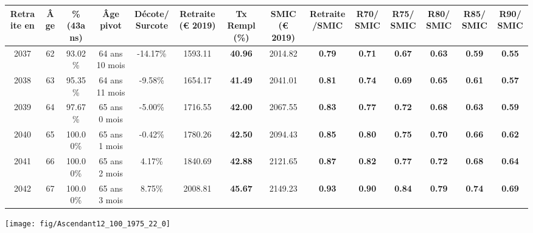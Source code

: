 \begin{adjustbox}{max width=\textwidth} 
\begin{tabular}[htb]{|c|c||c|c|c||c|c||c|c||c|c|c|c|c|} 
\hline 
 Retraite en &  Âge &  \%(43ans) &  Âge pivot &  Décote/Surcote &  Retraite (\euro{} 2019) &  Tx Rempl(\%) &  SMIC (\euro{} 2019) &  Retraite/SMIC &  R70/SMIC &  R75/SMIC &  R80/SMIC &  R85/SMIC &  R90/SMIC \\ 
\hline \hline 
 2037 &  62 &  93.02\% &  64 ans 10 mois &  -14.17\% &  1593.11 &  {\bf 40.96} &  2014.82 &  {\bf {\color{red} 0.79}} &  {\bf {\color{red} 0.71}} &  {\bf {\color{red} 0.67}} &  {\bf {\color{red} 0.63}} &  {\bf {\color{red} 0.59}} &  {\bf {\color{red} 0.55}} \\ 
\hline 
 2038 &  63 &  95.35\% &  64 ans 11 mois &  -9.58\% &  1654.17 &  {\bf 41.49} &  2041.01 &  {\bf {\color{red} 0.81}} &  {\bf {\color{red} 0.74}} &  {\bf {\color{red} 0.69}} &  {\bf {\color{red} 0.65}} &  {\bf {\color{red} 0.61}} &  {\bf {\color{red} 0.57}} \\ 
\hline 
 2039 &  64 &  97.67\% &  65 ans 0 mois &  -5.00\% &  1716.55 &  {\bf 42.00} &  2067.55 &  {\bf {\color{red} 0.83}} &  {\bf {\color{red} 0.77}} &  {\bf {\color{red} 0.72}} &  {\bf {\color{red} 0.68}} &  {\bf {\color{red} 0.63}} &  {\bf {\color{red} 0.59}} \\ 
\hline 
 2040 &  65 &  100.00\% &  65 ans 1 mois &  -0.42\% &  1780.26 &  {\bf 42.50} &  2094.43 &  {\bf {\color{red} 0.85}} &  {\bf {\color{red} 0.80}} &  {\bf {\color{red} 0.75}} &  {\bf {\color{red} 0.70}} &  {\bf {\color{red} 0.66}} &  {\bf {\color{red} 0.62}} \\ 
\hline 
 2041 &  66 &  100.00\% &  65 ans 2 mois &  4.17\% &  1840.69 &  {\bf 42.88} &  2121.65 &  {\bf {\color{red} 0.87}} &  {\bf {\color{red} 0.82}} &  {\bf {\color{red} 0.77}} &  {\bf {\color{red} 0.72}} &  {\bf {\color{red} 0.68}} &  {\bf {\color{red} 0.64}} \\ 
\hline 
 2042 &  67 &  100.00\% &  65 ans 3 mois &  8.75\% &  2008.81 &  {\bf 45.67} &  2149.23 &  {\bf {\color{red} 0.93}} &  {\bf {\color{red} 0.90}} &  {\bf {\color{red} 0.84}} &  {\bf {\color{red} 0.79}} &  {\bf {\color{red} 0.74}} &  {\bf {\color{red} 0.69}} \\ 
\hline 
\hline 
\end{tabular} 
\end{adjustbox} 
 
 \vspace{0.1cm} 

 {\hspace{-2.2cm}\texttt{[image: fig/Ascendant12\_100\_1975\_22\_0]}} 

